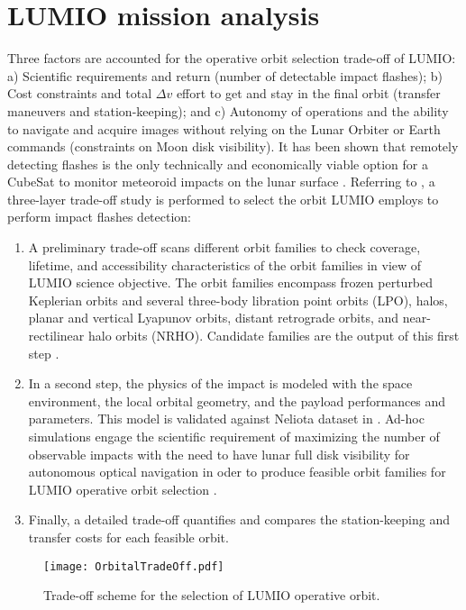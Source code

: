 \section{LUMIO mission analysis}\label{sec:LUMIO operative orbit}
Three factors are accounted for the operative orbit selection trade-off of LUMIO: a) Scientific requirements and return (\eg number of detectable impact flashes); b) Cost constraints and total $\Delta v$ effort to get and stay in the final orbit (\eg transfer maneuvers and station-keeping); and c) Autonomy of operations and the ability to navigate and acquire images without relying on the Lunar Orbiter or Earth commands (\eg constraints on Moon disk visibility). It has been shown that remotely detecting flashes is the only technically and economically viable option for a CubeSat to monitor meteoroid impacts on the lunar surface \cite{Ana2018FrontiersLUMIO}. Referring to , a three-layer trade-off study is performed to select the orbit LUMIO employs to perform impact flashes detection:
%
\begin{enumerate}
	\item A preliminary trade-off scans different orbit families to check coverage, lifetime, and accessibility characteristics of the orbit families in view of LUMIO science objective. The orbit families encompass frozen perturbed Keplerian orbits \cite{condoleo2017frozen} and several three-body libration point orbits (LPO), \ie halos, planar and vertical Lyapunov orbits, distant retrograde orbits, and near-rectilinear halo orbits (NRHO). Candidate families are the output of this first step \cite{Ana2018FrontiersLUMIO}.
	\item In a second step, the physics of the impact is modeled with the space environment, the local orbital geometry, and the payload performances and parameters. This model is validated against Neliota dataset in \textcite{Ana2018FrontiersLUMIO}. Ad-hoc simulations engage the scientific requirement of maximizing the number of observable impacts with the need to have lunar full disk visibility for autonomous optical navigation in oder to produce feasible orbit families for LUMIO operative orbit selection \cite{franzese2018NavSciTech}.
	\item Finally, a detailed trade-off quantifies and compares the station-keeping and transfer costs for each feasible orbit.
\end{enumerate}
%
%
\begin{figure}[b!]
	\centering
	\texttt{[image: OrbitalTradeOff.pdf]}
	\caption{Trade-off scheme for the selection of LUMIO operative orbit.}
	\label{fig:OrbitalTradeOff}
\end{figure}
